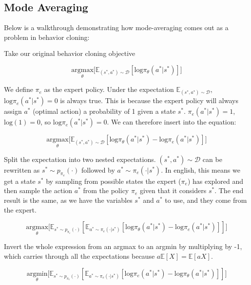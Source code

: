 
\subsection{Mode Averaging}
\begin{flushleft}
    \large Below is a walkthrough demonstrating how mode-averaging comes out as a problem in behavior cloning: \break

    Take our original behavior cloning objective

    $$\underset{\theta}{\textrm{argmax}}\biggl[\mathbb{E}_{(s^{*},a^{*}) \sim \mathcal{D}}[\mathrm{log}\pi_\theta(a^{*}|s^{*})]\biggr]$$

    We define $\pi_e$ as the expert policy. Under the expectation $\mathbb{E}_{(s^{*},a^{*}) \sim \mathcal{D}}$, $\mathrm{log}\pi_e(a^{*}|s^{*}) = 0$ is always true. This is because the expert policy will always assign $a^{*}$ (optimal action) a probability of 1 given a state $s^{*}$. $\pi_e(a^{*}|s^{*}) = 1$, $\mathrm{log}(1) = 0$, so  $\mathrm{log}\pi_e(a^{*}|s^{*}) = 0$. We can therefore insert into the equation:

    $$\underset{\theta}{\textrm{argmax}}\biggl[\mathbb{E}_{(s^{*},a^{*}) \sim \mathcal{D}}[\mathrm{log}\pi_\theta(a^{*}|s^{*}) - \mathrm{log}\pi_e(a^{*}|s^{*})]\biggr]$$

    Split the expectation into two nested expectations. $(s^{*},a^{*}) \sim \mathcal{D}$ can be rewritten as $s^{*} \sim p_{\pi_e}(\cdot)$ followed by $a^{*} \sim \pi_e(\cdot|s^{*})$. In english, this means we get a state $s^{*}$ by sampling from possible states the expert ($\pi_e$) has explored and then sample the action $a^{*}$ from the policy $\pi_e$ given that it considers $s^{*}$. The end result is the same, as we have the variables $s^{*}$ and $a^{*}$ to use, and they come from the expert.

    $$\underset{\theta}{\textrm{argmax}}\biggl[\mathbb{E}_{s^{*} \sim p_{\pi_e}(\cdot)}[\mathbb{E}_{a^{*} \sim \pi_e(\cdot|s^{*})}[\mathrm{log}\pi_\theta(a^{*}|s^{*}) - \mathrm{log}\pi_e(a^{*}|s^{*})]]\biggr]$$

    Invert the whole expression from an argmax to an argmin by multiplying by -1, which carries through all the expectations because $a\mathbb{E}[X] = \mathbb{E}[aX]$.

    $$\underset{\theta}{\textrm{argmin}}\biggl[\mathbb{E}_{s^{*} \sim p_{\pi_e}(\cdot)}[\mathbb{E}_{a^{*} \sim \pi_e(\cdot|s^{*})}[\mathrm{log}\pi_e(a^{*}|s^{*}) - \mathrm{log}\pi_\theta(a^{*}|s^{*})]]\biggr]$$


\end{flushleft}
